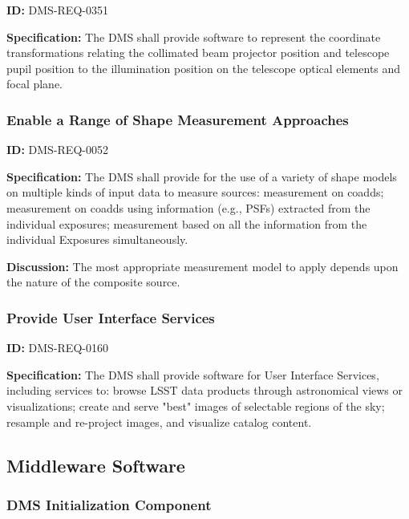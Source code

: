 \documentclass[SE,toc,lsstdraft]{lsstdoc}
\begin{document}
\label{DMS-REQ-0351}
\textbf{ID:} DMS-REQ-0351

\textbf{Specification:}  The DMS shall provide software to represent the coordinate transformations relating the collimated beam projector position and telescope pupil position to the illumination position on the telescope optical elements and focal plane.






\subsubsection{Enable a Range of Shape Measurement Approaches}

\label{DMS-REQ-0052}
\textbf{ID:} DMS-REQ-0052

\textbf{Specification:} The DMS shall provide for the use of a variety of shape models on multiple kinds of input data to measure sources: measurement on coadds; measurement on coadds using information (e.g., PSFs) extracted from the individual exposures; measurement based on all the information from the individual Exposures simultaneously.

\textbf{Discussion: }The most appropriate measurement model to apply depends upon the nature of the composite source.




\subsubsection{Provide User Interface Services}

\label{DMS-REQ-0160}
\textbf{ID:} DMS-REQ-0160

\textbf{Specification:} The DMS shall provide software for User Interface Services, including services to: browse LSST data products through astronomical views or visualizations; create and serve "best" images of selectable regions of the sky; resample and re-project images, and visualize catalog content.






\subsection{Middleware Software}





\subsubsection{DMS Initialization Component}
\end{document}
